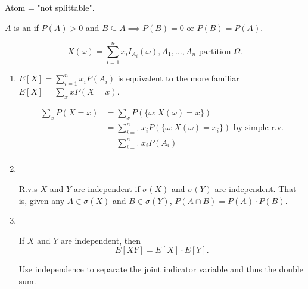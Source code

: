 \documentclass[class=article,crop=false]{standalone}
\begin{document}
\begin{intuition}
Atom = "not splittable".
\end{intuition}
\begin{defn}[atom]
	$ A$ is an   if $ P(A) >0$ and  $ B \subseteq A \implies P(B) = 0 \text{ or } P(B)=P(A) $. 
\end{defn}

\begin{claim}[]
\[
	X(\omega) = \sum_{ i= 1}^{ n} x_i I_{A_i}(\omega), A_1,\ldots,A_n \text{ partition } \Omega 
.\] 
\begin{enumerate}[label=\arabic*)]
	\item $ E[X] = \sum_{ i= 1}^{ n} x_i P(A_i)$ is equivalent to the more familiar $ E[X]=\sum_x x P(X=x )$.
		\begin{prf}
		\begin{align*}
			\sum_x P(X=x) &= \sum_x P(\{\omega: X(\omega)=x\} ) \\
				      &= \sum_{ i= 1}^{ n} x_i P(\{\omega: X(\omega)=x_i\} ) \text{ by simple r.v.}  \\
				      &= \sum_{ i= 1}^{ n} x_i P(A_i) \\
		\end{align*}
		\end{prf}
	\item 
~\begin{defn}[independent r.v.]
	R.v.s $ X$ and  $ Y$ are independent if  $ \sigma(X)$ and $ \sigma(Y)$ are independent. That is, given any $ A \in \sigma(X)$ and $ B \in \sigma(Y)$, $ P(A \cap B) = P(A) \cdot  P(B)$.
\end{defn}
\item
~\begin{thm}[]
If $ X$ and  $ Y$ are independent, then
 \[
	 E[XY]=E[X] \cdot E[Y]
.\] 
\end{thm}
\begin{prf}
Use independence to separate the joint indicator variable and thus the double sum.


\end{prf}
\end{enumerate}
\end{claim}
\end{document}
